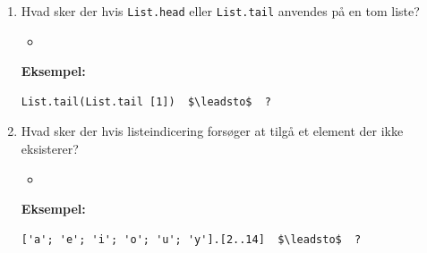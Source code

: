 \documentclass[rgb]{beamer}
\begin{document}
\begin{frame}[fragile]

\begin{enumerate}
\item Hvad sker der hvis \lstinline{List.head} eller \lstinline{List.tail}
anvendes på en tom liste?

  \vspace{1mm}
  \begin{itemize}
  \item \underline{\hspace{10cm}}
  \end{itemize}
  \vspace{1mm}

\textbf{Eksempel:}

\begin{lstlisting}[numbers=none,frame=none,mathescape]
  List.tail(List.tail [1])  $\leadsto$  ?
\end{lstlisting}

\item Hvad sker der hvis listeindicering forsøger at tilgå et element der ikke eksisterer?

  \vspace{1mm}
  \begin{itemize}
  \item \underline{\hspace{10cm}}
  \end{itemize}
  \vspace{1mm}

\textbf{Eksempel:}

\begin{lstlisting}[numbers=none,frame=none,mathescape]
  ['a'; 'e'; 'i'; 'o'; 'u'; 'y'].[2..14]  $\leadsto$  ?
\end{lstlisting}
\end{enumerate}

\end{frame}
\end{document}
